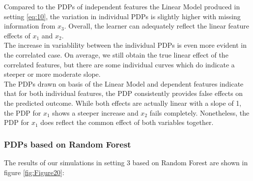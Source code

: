 \documentclass[
]{krantz}
\begin{document}
Compared to the PDPs of independent features the Linear Model produced in setting \eqref{eq:10}, the variation in individual PDPs is slightly higher with missing information from \(x_3\). Overall, the learner can adequately reflect the linear feature effects of \(x_1\) and \(x_2\).\\
The increase in variablility between the individual PDPs is even more evident in the correlated case. On average, we still obtain the true linear effect of the correlated features, but there are some individual curves which do indicate a steeper or more moderate slope.\\
The PDPs drawn on basis of the Linear Model and dependent features indicate that for both individual features, the PDP consistently provides false effects on the predicted outcome. While both effects are actually linear with a slope of 1, the PDP for \(x_1\) shows a steeper increase and \(x_2\) fails completely. Nonetheless, the PDP for \(x_1\) does reflect the common effect of both variables together.

\hypertarget{pdps-based-on-random-forest-2}{%
\subsubsection{PDPs based on Random Forest}\label{pdps-based-on-random-forest-2}}

The results of our simulations in setting 3 based on Random Forest are shown in figure \ref{fig:Figure20}:
\end{document}
